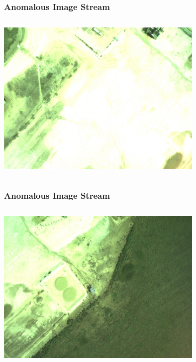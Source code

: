\documentclass{beamer}
\begin{document}
\begin{frame}
\frametitle{Anomalous Image Stream}
\begin{columns}
\begin{centering}
\includegraphics[width = 10cm]{Figures/bad2}
\end{centering}
\end{columns}
\end{frame}


\begin{frame}
\frametitle{Anomalous Image Stream}
\begin{columns}
\begin{centering}
\includegraphics[width = 10cm]{Figures/bad3}
\end{centering}
\end{columns}
\end{frame}
\end{document}
